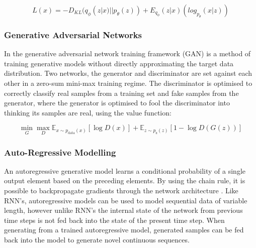 \begin{equation}
\label{eq:vae}
L(x) = -D_{KL}(q_{\phi}(z|x)||p_{\theta}(z)) + E_{q_\phi}(z|x)(log_{p_{\theta}}(x|z))
\end{equation}

\subsubsection{Generative Adversarial Networks}

In the generative adversarial network training framework (GAN) \cite{goodfellow2014generative} is a method of training generative models without directly approximating the target data distribution. 
Two networks, the generator and discriminator are set against each other in a zero-sum mini-max training regime. 
The discriminator is optimised to correctly classify real samples from a training set and fake samples from the generator, where the generator is optimised to fool the discriminator into thinking its samples are real, using the value function: 

\begin{equation}
\label{eq:gan}
\min_{G}\max_{D}\mathbb{E}_{x\sim p_{\text{data}}(x)}[\log{D(x)}] + \mathbb{E}_{z\sim p_{\text{z}}(z)}[1 - \log{D(G(z))}]
\end{equation}

\subsubsection{Auto-Regressive Modelling}

An autoregressive generative model learns a conditional probability of a single output element based on the preceding elements. 
By using the chain rule, it is possible to backpropagate gradients through the network architecture \cite{larochelle2011neural}. 
Like RNN's, autoregressive models can be used to model sequential data of variable length, however unlike RNN's the internal state of the network from previous time steps is not fed back into the state of the present time step. 
When generating from a trained autoregressive model, generated samples can be fed back into the model to generate novel continuous sequences.



